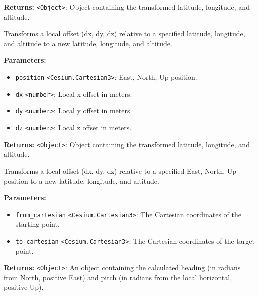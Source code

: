 \documentclass[12pt,a4paper]{article}
\begin{document}
\noindent \textbf{Returns:} \texttt{<Object>}: Object containing the transformed latitude, longitude, and altitude.

\noindent Transforms a local offset (dx, dy, dz) relative to a specified latitude, longitude, and altitude to a new latitude, longitude, and altitude.

\vspace{5mm}
\noindent {}


\noindent \textbf{Parameters:}
\begin{itemize}
  \item \texttt{position} \texttt{<Cesium.Cartesian3>}: East, North, Up position.
  \item \texttt{dx} \texttt{<number>}: Local x offset in meters.
  \item \texttt{dy} \texttt{<number>}: Local y offset in meters.
  \item \texttt{dz} \texttt{<number>}: Local z offset in meters.
\end{itemize}

\noindent \textbf{Returns:} \texttt{<Object>}: Object containing the transformed latitude, longitude, and altitude.

\noindent Transforms a local offset (dx, dy, dz) relative to a specified East, North, Up position to a new latitude, longitude, and altitude.

\vspace{5mm}
\noindent {}


\noindent \textbf{Parameters:}
\begin{itemize}
  \item \texttt{from\_cartesian} \texttt{<Cesium.Cartesian3>}: The Cartesian coordinates of the starting point.
  \item \texttt{to\_cartesian} \texttt{<Cesium.Cartesian3>}: The Cartesian coordinates of the target point.
\end{itemize}

\noindent \textbf{Returns:} \texttt{<Object>}: An object containing the calculated heading (in radians from North, positive East) and pitch (in radians from the local horizontal, positive Up).
\end{document}
